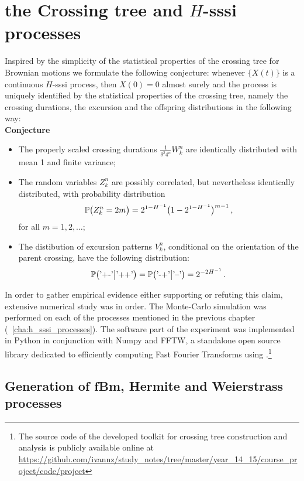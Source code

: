 \chapter{the Crossing tree and $H$-sssi processes} %
\label{cha:the_crossing_tree_and_h_sssi_processes}

Inspired by the simplicity of the statistical properties of the crossing tree for
Brownian motions we formulate the following conjecture: whenever $\{X(t)\}$ is a
continuous $H$-sssi process, then $X(0)= 0$ almost surely and the process is uniquely
identified by the statistical properties of the crossing tree, namely the crossing
durations, the excursion and the offspring distributions in the following way:\\
\noindent \textbf{Conjecture}\begin{itemize}
	\item The properly scaled crossing durations $\tfrac{1}{\delta^2 4^n} W_k^n$
    are identically distributed with mean 1 and finite variance;
    \item The random variables $Z_k^n$ are possibly correlated, but nevertheless
    identically distributed, with probability distribution
    \[ \mathbb{P}\bigl(Z_k^n=2m\bigr) = 2^{1-H^{-1}}\bigl(1-2^{1-H^{-1}}\bigr)^{m-1} \,,\]
    for all $m=1,2,\ldots$;
    \item The distibution of excursion patterns $V_k^n$, conditional on the orientation
    of the parent crossing, have the following distribution:
    \[ \mathbb{P}\bigl( \text{'+-'} \bigr.\bigl\lvert \text{'++'} \bigr)
	= \mathbb{P}\bigl( \text{'-+'} \bigr.\bigl\lvert \text{'--'} \bigr)
	= 2^{-2H^{-1}} \,. \]
\end{itemize}

In order to gather empirical evidence either supporting or refuting this claim,
extensive numerical study was in order. The Monte-Carlo simulation was performed
on each of the processes mentioned in the previous chapter (~\ref{cha:h_sssi_processes}).
The software part of the experiment was implemented in Python in conjunction with
Numpy and FFTW, a standalone open source library dedicated to efficiently computing
Fast Fourier Transforms using .\footnote{The source code of the developed toolkit for crossing tree
construction and analysis is publicly available online at
\url{https://github.com/ivannz/study_notes/tree/master/year_14_15/course_project/code/project}}


\section{Generation of fBm, Hermite and Weierstrass processes} %
\label{sec:generation_of_fbm_hermite_and_weierstrass_processes}

